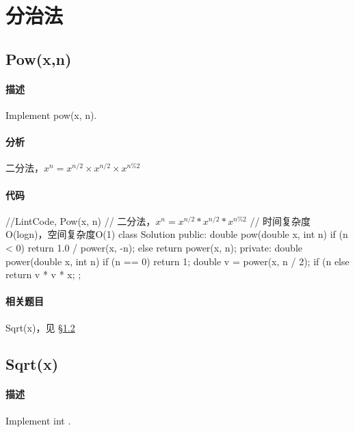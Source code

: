 \chapter{分治法}


\section{Pow(x,n)} %
\label{sec:pow}


\subsubsection{描述}
Implement pow(x, n).


\subsubsection{分析}
二分法，$x^n = x^{n/2} \times x^{n/2} \times x^{n\%2}$


\subsubsection{代码}
\begin{Code}
//LintCode, Pow(x, n)
// 二分法，$x^n = x^{n/2} * x^{n/2} * x^{n\%2}$
// 时间复杂度O(logn)，空间复杂度O(1)
class Solution {
public:
    double pow(double x, int n) {
        if (n < 0) return 1.0 / power(x, -n);
        else return power(x, n);
    }
private:
    double power(double x, int n) {
        if (n == 0) return 1;
        double v = power(x, n / 2);
        if (n %
        else return v * v * x;
    }
};
\end{Code}


\subsubsection{相关题目}

\begindot
\item Sqrt(x)，见 \S \ref{sec:sqrt}
\myenddot


\section{Sqrt(x)} %
\label{sec:sqrt}

\subsubsection{描述}
Implement int .

